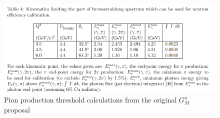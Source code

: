 \begin{figure}[h!]
    \centering
    \includegraphics{Images/kinematic_calc/Table4-GMn original proposal.png}
    \caption{Pion production threshold calculations from the original $G_M^n$ proposal}
    \label{fig:table4 from GMn proposal}
\end{figure}


\begin{table}[h!]
    \centering
    \caption{Results I obtained for the same input parameters as in the proposal}
    \label{Threshold calculation results table}
\end{table}

